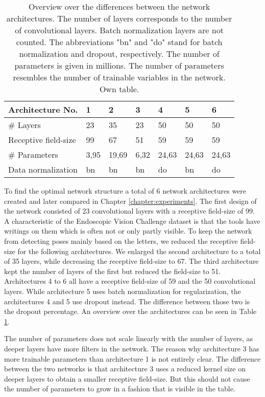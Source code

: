 \begin{table}[]
\centering
\begin{tabular}{|l||llllll|}
\hline Architecture No.        & 1          & 2          & 3          & 4          & 5          & 6        \\ \hline\hline
\rowcolor{Gray}
\# Layers               & 23         & 35         & 23         & 50         & 50         & 50       \\
Receptive field-size    & 99         & 67         & 51         & 59         & 59         & 59       \\
\rowcolor{Gray}
\# Parameters & 3,95  & 19,69 & 6,32  & 24,63 & 24,63   & 24,63 \\
Data normalization      & bn & bn & bn & do    & bn & do \\ \hline
\end{tabular}
\caption{Overview over the differences between the network architectures. The number of layers corresponds to the number of convolutional layers. Batch normalization layers are not counted. The abbreviations "bn" and "do" stand for batch normalization and dropout, respectively. The number of parameters is given in millions. The number of parameters resembles the number of trainable variables in the network. Own table.}
\label{table:network_architectures}
\end{table}

To find the optimal network structure a total of 6 network architectures were created and later compared in Chapter \ref{chapter:experiments}. The first design of the network consisted of 23 convolutional layers with a receptive field-size of 99. A characteristic of the Endoscopic Vision Challenge dataset is that the tools have writings on them which is often not or only partly visible. To keep the network from detecting poses mainly based on the letters, we reduced the receptive field-size for the following architectures. We enlarged the second architecture to a total of 35 layers, while decreasing the receptive field-size to 67. The third architecture kept the number of layers of the first but reduced the field-size to 51. Architectures 4 to 6 all have a receptive field-size of 59 and the 50 convolutional layers. While architecture 5 uses batch normalization for regularization, the architectures 4 and 5 use dropout instead. The difference between those two is the dropout percentage. An overview over the architectures can be seen in Table \ref{table:network_architectures}. 

The number of parameters does not scale linearly with the number of layers, as deeper layers have more filters in the network. The reason why architecture 3 has more trainable parameters than architecture 1 is not entirely clear. The difference between the two networks is that architecture 3 uses a reduced kernel size on deeper layers to obtain a smaller receptive field-size. But this should not cause the number of parameters to grow in a fashion that is visible in the table.


